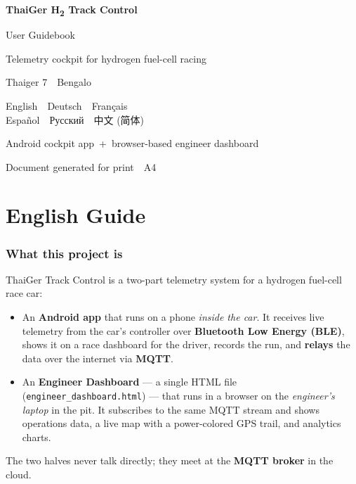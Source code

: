 \documentclass[11pt,a4paper,oneside]{report}
\newcommand{\Htwo}{H\textsubscript{2}}
\newcommand{\midsep}{\,\textperiodcentered\,}
\newcommand{\code}[1]{\texttt{#1}}
\newcommand{\guidepart}[1]{%
  \clearpage
  \part*{#1}%
  \addcontentsline{toc}{part}{#1}%
  \setcounter{section}{0}%
}
\begin{document}
\begin{titlepage}
\centering
\vspace*{2.5cm}
{\Huge\bfseries\color{brandblue} ThaiGer \Htwo{} Track Control\par}
\vspace{0.6cm}
{\LARGE User Guidebook\par}
\vspace{0.3cm}
{\large Telemetry cockpit for hydrogen fuel-cell racing\par}
\vspace{1.4cm}
{\large Thaiger 7 \midsep{} Bengalo\par}
\vspace{2.2cm}
\begin{tcolorbox}[width=0.7\linewidth,colback=codebg,colframe=codeframe,
  boxrule=0.5pt,arc=3pt,halign=center]
\large
English \midsep{} Deutsch \midsep{} Français\\
Español \midsep{} Русский \midsep{} 中文 (简体)
\end{tcolorbox}
\vfill
{\small Android cockpit app \,+\, browser-based engineer dashboard\par}
{\small Document generated for print \midsep{} A4\par}
\end{titlepage}

\clearpage
\tableofcontents
\clearpage


\guidepart{English Guide}

\section{What this project is}
ThaiGer Track Control is a two-part telemetry system for a hydrogen fuel-cell
race car:
\begin{itemize}
  \item An \textbf{Android app} that runs on a phone \emph{inside the car}. It
    receives live telemetry from the car's controller over \textbf{Bluetooth Low
    Energy (BLE)}, shows it on a race dashboard for the driver, records the run,
    and \textbf{relays} the data over the internet via \textbf{MQTT}.
  \item An \textbf{Engineer Dashboard} --- a single HTML file
    (\code{engineer\_dashboard.html}) --- that runs in a browser on the
    \emph{engineer's laptop} in the pit. It subscribes to the same MQTT stream and
    shows operations data, a live map with a power-colored GPS trail, and
    analytics charts.
\end{itemize}
The two halves never talk directly; they meet at the \textbf{MQTT broker} in the
cloud.
\end{document}
